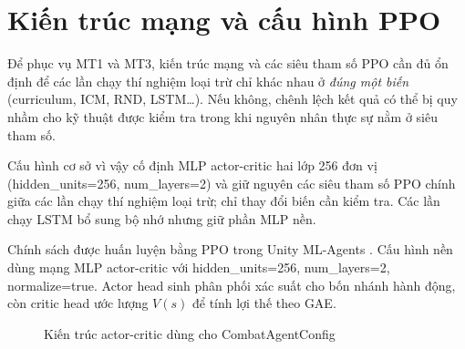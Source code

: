 \section{Kiến trúc mạng và cấu hình PPO}

Để phục vụ MT1 và MT3, kiến trúc mạng và các siêu tham số PPO cần đủ ổn định để các lần chạy thí nghiệm loại trừ chỉ khác nhau ở \emph{đúng một biến} (curriculum, ICM, RND, LSTM\dots). Nếu không, chênh lệch kết quả có thể bị quy nhầm cho kỹ thuật được kiểm tra trong khi nguyên nhân thực sự nằm ở siêu tham số.

Cấu hình cơ sở vì vậy cố định MLP actor-critic hai lớp 256 đơn vị (hidden\_units=256, num\_layers=2) và giữ nguyên các siêu tham số PPO chính giữa các lần chạy thí nghiệm loại trừ; chỉ thay đổi biến cần kiểm tra. Các lần chạy LSTM bổ sung bộ nhớ nhưng giữ phần MLP nền.

Chính sách được huấn luyện bằng PPO trong Unity ML-Agents \cite{Juliani2018}. Cấu hình nền dùng mạng MLP actor-critic với hidden\_units=256, num\_layers=2, normalize=true. Actor head sinh phân phối xác suất cho bốn nhánh hành động, còn critic head ước lượng $V(s)$ để tính lợi thế theo GAE.

\begin{figure}[H]
    \centering
    \caption{Kiến trúc actor-critic dùng cho CombatAgentConfig}
    \label{fig:actor_critic_architecture}
\end{figure}

